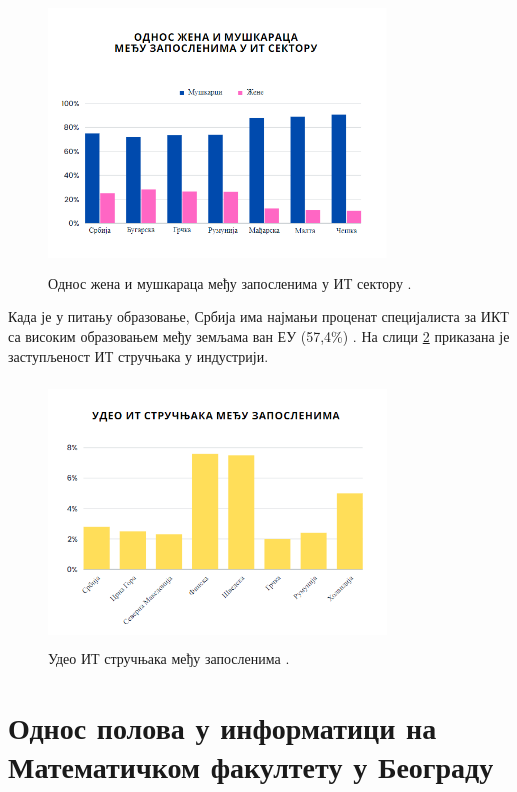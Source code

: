 \documentclass[a4paper]{article}
\begin{document}
\begin{figure}[h!]
    \begin{center}
        \includegraphics[width=0.8\textwidth, height=7.2cm]{Slike/odnos_muskaraca_i_zena.png}
    \end{center}
    \caption{Однос жена и мушкараца међу запосленима у ИТ сектору \cite{danas_it}.}
    \label{fig:zene_i_muskarci_it}
\end{figure}

\newpage
Када је у питању образовање, Србија има најмањи проценат специјалиста за ИКТ са високим 
образовањем међу земљама ван ЕУ (57,4\%) \cite{danas_it}. На слици \ref{fig:it_evropa} 
приказана је заступљеност ИТ стручњака у индустрији. 

\begin{figure}[h!]
    \begin{center}
        \includegraphics[width=0.8\textwidth, height=7cm]{Slike/radna_snaga.png}
    \end{center}
    \caption{Удео ИТ стручњака међу запосленима \cite{danas_it}.}
    \label{fig:it_evropa}
\end{figure}

\section{Однос полова у информатици на Математичком факултету у Београду}
\end{document}
